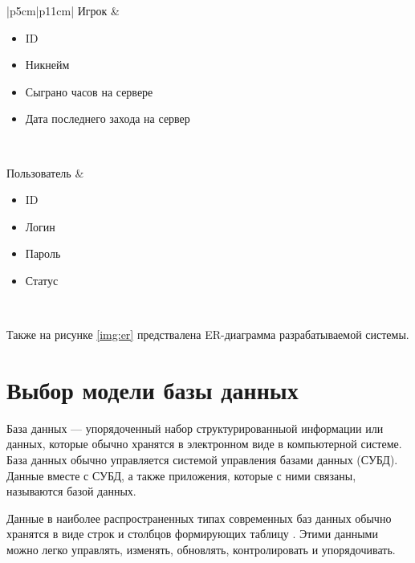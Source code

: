 \begin{center}
\begin{longtable}[c]{|p{5cm}|p{11cm}|}
        Игрок &
            \begin{minipage}[t]{\linewidth}
                \begin{itemize}[nosep,after=\strut]
                    \item ID
                    \item Никнейм
                    \item Сыграно часов на сервере
                    \item Дата последнего захода на сервер
                \end{itemize}
            \end{minipage}
        \\ \hline

        Пользователь &
            \begin{minipage}[t]{\linewidth}
                \begin{itemize}[nosep,after=\strut]
                    \item ID
                    \item Логин
                    \item Пароль
                    \item Статус
                \end{itemize}
            \end{minipage}
        \\ \hline
\end{longtable}
\end{center}

Также на рисунке \ref{img:er} предствалена ER-диаграмма \cite{er} разрабатываемой системы.



\section{Выбор модели базы данных}

База данных \cite{db-is} --- упорядоченный набор структурированныой информации или данных, которые обычно хранятся в электронном виде в компьютерной системе. База данных обычно управляется системой управления базами данных (СУБД). Данные вместе с СУБД, а также приложения, которые с ними связаны, называются базой данных.

Данные в наиболее распространенных типах современных баз данных обычно хранятся в виде строк и столбцов формирующих таблицу \cite{db-is}. Этими данными можно легко управлять, изменять, обновлять, контролировать и упорядочивать.


